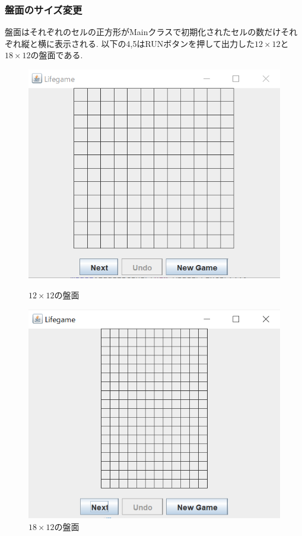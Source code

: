\documentclass[dvipdfmx]{jarticle}
\begin{document}
\subsubsection{盤面のサイズ変更}
盤面はそれぞれのセルの正方形がMainクラスで初期化されたセルの数だけそれぞれ縦と横に表示される.
以下の4,5はRUNボタンを押して出力した$12\times12$と$18\times12$の盤面である.
\begin{figure}[htbp]
  \begin{minipage}[b]{0.45\linewidth}
    \centering
    \includegraphics[keepaspectratio, scale=0.4]{panel_normal.png}
    \caption{$12\times12$の盤面}
  \end{minipage}
  \begin{minipage}[b]{0.45\linewidth}
    \centering
    \includegraphics[keepaspectratio, scale=0.4]{1812.png}
    \caption{$18\times12$の盤面}
  \end{minipage}
\end{figure}
\end{document}

